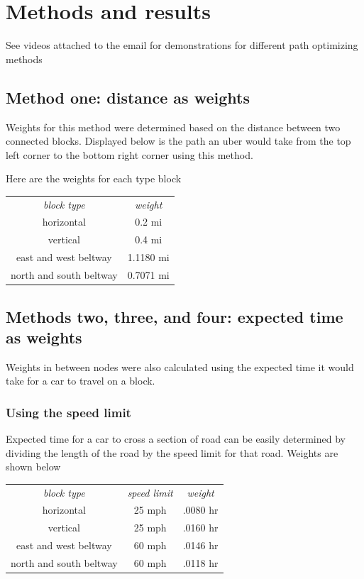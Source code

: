 \documentclass{article}
\begin{document}
\section{Methods and results}
See videos attached to the email for demonstrations for different path optimizing methods
\subsection{Method one: distance as weights}
Weights for this method were determined based on the distance between two connected blocks. Displayed below is the path an uber would take from the top left corner to the bottom right corner using this method.

Here are the weights for each type block
 
\begin{center}
\begin{tabular}{ |c|c| } 
 \hline
 \textit{block type} & \textit{weight} \\ 
 horizontal & 0.2 mi \\ 
 vertical & 0.4 mi\\
 east and west beltway & 1.1180 mi\\
 north and south beltway & 0.7071 mi\\
 \hline
\end{tabular}
\end{center}

\subsection{Methods two, three, and four: expected time as weights}
Weights in between nodes were also calculated using the expected time it would take for a car to travel on a block.
\subsubsection{Using the speed limit}
Expected time for a car to cross a section of road can be easily determined by dividing the length of the road by the speed limit for that road. Weights are shown below 
 
\begin{center}
\begin{tabular}{ |c|c|c| } 
 \hline
 \textit{block type} & \textit{speed limit}  & \textit{weight}\\ 
 horizontal & 25 mph & .0080 hr\\ 
 vertical & 25 mph & .0160 hr\\
 east and west beltway & 60 mph & .0146 hr\\
 north and south beltway & 60 mph & .0118 hr\\
 \hline
\end{tabular}
\end{center}
\end{document}
